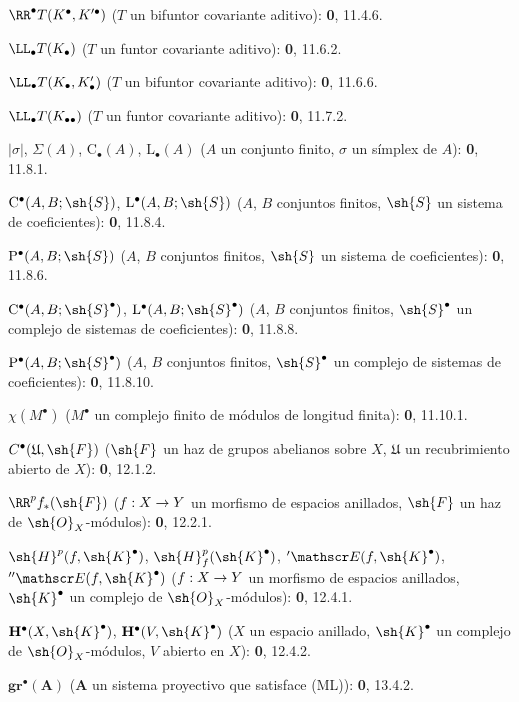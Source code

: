 \documentclass[oneside]{amsart}
\makeatletter
\renewcommand*{\mathcal}{\mathscr}
\newcommand{\ega@arrow}[2]{\mathchoice{#1}{#2}{#2}{#2}}
\renewcommand{\to}{\ega@arrow{\longrightarrow}{\rightarrow}}
\makeatother
\begin{document}
\begin{flushleft}
$\RR^\bullet T(K^\bullet,K'^{\bullet})$ ($T$ un bifuntor covariante
aditivo): \textbf 0, 11.4.6.

$\LL_\bullet T(K_\bullet)$ ($T$ un funtor covariante aditivo): \textbf 0, 11.6.2.

$\LL_\bullet T(K_\bullet,K'_\bullet)$ ($T$ un bifuntor covariante
aditivo): \textbf 0, 11.6.6.

$\LL_\bullet T(K_{\bullet\bullet})$ ($T$ un funtor covariante aditivo):
\textbf 0, 11.7.2.

$|\sigma|$, $\Sigma(A)$, $\mathrm C_\bullet(A)$, $\mathrm L_\bullet(A)$
($A$ un conjunto finito, $\sigma$ un símplex de $A$): \textbf 0, 11.8.1.

$\mathrm C^\bullet(A,B;\sh{S})$, $\mathrm L^\bullet(A,B;\sh{S})$
($A$, $B$ conjuntos finitos, $\sh{S}$ un sistema de coeficientes): \textbf 0, 11.8.4.

$\mathrm P^\bullet(A,B;\sh{S})$ ($A$, $B$ conjuntos finitos, $\sh{S}$ un
sistema de coeficientes): \textbf 0, 11.8.6.

$\mathrm C^\bullet(A,B;\sh{S}^\bullet)$,
$\mathrm L^\bullet(A,B;\sh{S}^\bullet)$ ($A$, $B$ conjuntos finitos,
$\sh{S}^\bullet$ un complejo de sistemas de coeficientes): \textbf 0, 11.8.8.

$\mathrm P^\bullet(A,B;\sh{S}^\bullet)$ ($A$, $B$ conjuntos finitos,
$\sh{S}^\bullet$ un complejo de sistemas de coeficientes): \textbf 0, 11.8.10.

$\chi(M^\bullet)$ ($M^\bullet$ un complejo finito de módulos de longitud finita):
\textbf 0, 11.10.1.

$C^\bullet(\mathfrak U,\sh{F})$ ($\sh{F}$ un haz de grupos abelianos
sobre $X$, $\mathfrak U$ un recubrimiento abierto de $X$): \textbf 0, 12.1.2.

$\RR^p f_*(\sh{F})$ ($f:X\to Y$ un morfismo de espacios anillados,
$\sh{F}$ un haz de $\sh{O}_X$-módulos): \textbf 0, 12.2.1.

$\sh{H}^p(f,\sh{K}^\bullet)$,
$\sh{H}^p_f(\sh{K}^\bullet)$, ${}'\mathcal E(f,\sh{K}^\bullet)$,
${}''\mathcal E(f,\sh{K}^\bullet)$ ($f:X\to Y$ un morfismo de espacios anillados,
$\sh{K}^\bullet$ un complejo de $\sh{O}_X$-módulos): \textbf 0, 12.4.1.

$\mathbf H^\bullet(X,\sh{K}^\bullet)$,
$\mathbf H^\bullet(V,\sh{K}^\bullet)$ ($X$ un espacio anillado,
$\sh{K}^\bullet$ un complejo de $\sh{O}_X$-módulos, $V$ abierto en $X$):
\textbf 0, 12.4.2.

$\mathbf{gr}^\bullet(\mathbf A)$ ($\mathbf A$ un sistema proyectivo que satisface (ML)):
\textbf 0, 13.4.2.


\end{flushleft}
\end{document}
